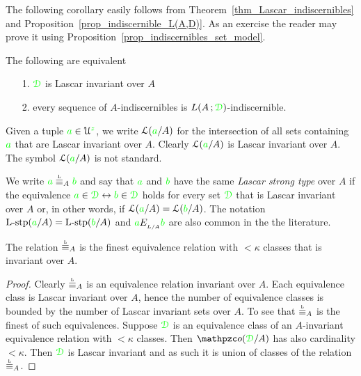 The following corollary easily follows from Theorem~\ref{thm_Lascar_indiscernibles} and Proposition~\ref{prop_indiscernible_L(A,D)}.
As an exercise the reader may prove it using Proposition~\ref{prop_indiscernibles_set_model}.
 
\begin{corollary}
The following are equivalent
\begin{itemize}
\item[1.] ${\color{green}\EuScript D}$ is Lascar invariant over $A$
\item[2.] every sequence of $A$-indiscernibles is $L(A\,;{\color{green}\EuScript D})$-indiscernible.
\end{itemize}
\end{corollary}

\noindent\llap{\textcolor{red}{\Large\warning}\kern1.5ex}%
Given a tuple ${\color{green} a}\in\EuScript U^{\color{green} z}$, we write \emph{$\EuScript L({\color{green} a}/A)$\/} for the intersection of all sets containing ${\color{green} a}$ that are Lascar invariant over $A$.
Clearly $\EuScript L({\color{green} a}/A)$ is Lascar invariant over $A$.
The symbol $\EuScript L({\color{green} a}/A)$ is not standard.

\begin{definition}\label{def_Lascar_type}We write \emph{${\gr a}\stackrel{\smash{\scalebox{.5}{\rm L}}}{\equiv}_A{\gr b}$\/} and say that ${\color{green} a}$ and ${\color{green} b}$ have the same \emph{Lascar strong type\/} over $A$ if the equivalence ${\color{green} a}\in{\color{green}\EuScript D}\leftrightarrow{\color{green}b}\in{\color{green}\EuScript D}$ holds for every set ${\color{green}\EuScript D}$ that is Lascar invariant over $A$ or, in other words, if $\EuScript L({\color{green} a}/A)=\EuScript L({\color{green} b}/A)$.
The notation $\mbox{L-stp}({\color{green} a}/A)=\mbox{L-stp}({\color{green} b}/A)$ and ${\color{green} a}E_{_{L/A}}{\color{green} b}$ are also common in the the literature.
\end{definition}

\begin{proposition}
  The relation $\equivL_A$ is the finest equivalence relation with $<\kappa$ classes that is invariant over $A$.
\end{proposition}

\begin{proof}
  Clearly $\equivL_A$ is an equivalence relation invariant over $A$.
Each equivalence class is Lascar invariant over $A$, hence the number of equivalence classes is bounded by the number of Lascar invariant sets over $A$.
To see that $\equivL_A$ is the finest of such equivalences.
Suppose ${\color{green}\EuScript D}$ is an equivalence class of an $A$-invariant equivalence relation with $<\kappa$ classes.
Then $\oorbit(\grD/A)$ has also cardinality $<\kappa$.
Then ${\color{green}\EuScript D}$ is Lascar invariant and as such it is union of classes of the relation $\equivL_A$. 
\end{proof}


